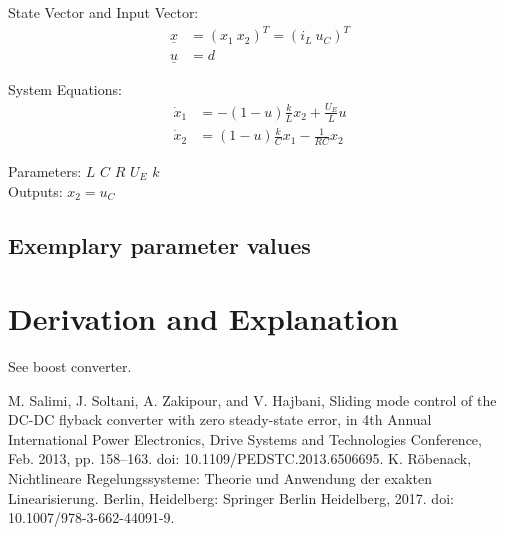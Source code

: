 \documentclass[10pt,a4paper]{article}
\begin{document}
	State Vector and Input Vector:
	\begin{align*}
		\underline{x} &= (x_1 \ x_2)^T = (i_L \ u_C)^T \\
		\underline{u} &= d
	\end{align*}
	
	\noindent System Equations:			
	\begin{subequations}
	\begin{align}
		\dot{x}_1 &= -(1-u)\frac{k}{L}x_2 + \frac{U_E}{L}u \\
		\dot{x}_2 &= (1-u)\frac{k}{C}x_1 - \frac{1}{RC}x_2
	\end{align}
	\end{subequations}

	\noindent
	Parameters: $L$ $C$ $R$ $U_E$ $k$ %
	\\
	Outputs: $x_2 = u_C$
	
	
	
	
	\subsection{Exemplary parameter values}
	

	
	\section{Derivation and Explanation} %
	See boost converter.
	
	
	\begin{thebibliography}{10}		
		M. Salimi, J. Soltani, A. Zakipour, and V. Hajbani, Sliding mode control of the DC-DC flyback converter with zero steady-state error, in 4th Annual International Power Electronics, Drive Systems and Technologies Conference, Feb. 2013, pp. 158–163. doi: 10.1109/PEDSTC.2013.6506695.
		K. Röbenack, Nichtlineare Regelungssysteme: Theorie und Anwendung der exakten Linearisierung. Berlin, Heidelberg: Springer Berlin Heidelberg, 2017. doi: 10.1007/978-3-662-44091-9.
	\end{thebibliography}
\end{document}
